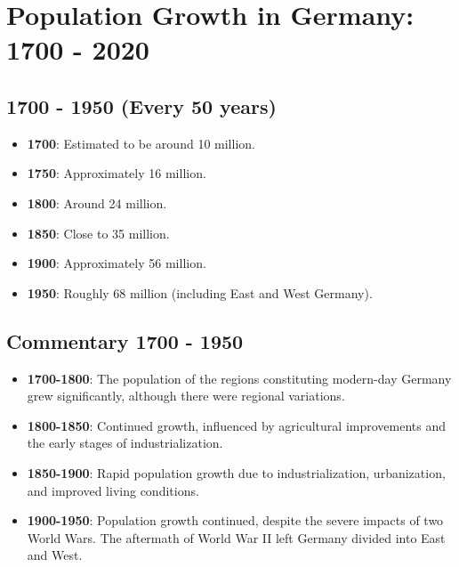 \section{Population Growth in Germany: 1700 - 2020}

\subsection*{1700 - 1950 (Every 50 years)}
\begin{itemize}
    \item \textbf{1700}: Estimated to be around 10 million. 
    \item \textbf{1750}: Approximately 16 million.
    \item \textbf{1800}: Around 24 million.
    \item \textbf{1850}: Close to 35 million.
    \item \textbf{1900}: Approximately 56 million.
    \item \textbf{1950}: Roughly 68 million (including East and West Germany).
\end{itemize}

\subsection*{Commentary 1700 - 1950}
\begin{itemize}
    \item \textbf{1700-1800}: The population of the regions constituting modern-day Germany grew significantly, although there were regional variations.
    \item \textbf{1800-1850}: Continued growth, influenced by agricultural improvements and the early stages of industrialization.
    \item \textbf{1850-1900}: Rapid population growth due to industrialization, urbanization, and improved living conditions.
    \item \textbf{1900-1950}: Population growth continued, despite the severe impacts of two World Wars. The aftermath of World War II left Germany divided into East and West.
\end{itemize}

